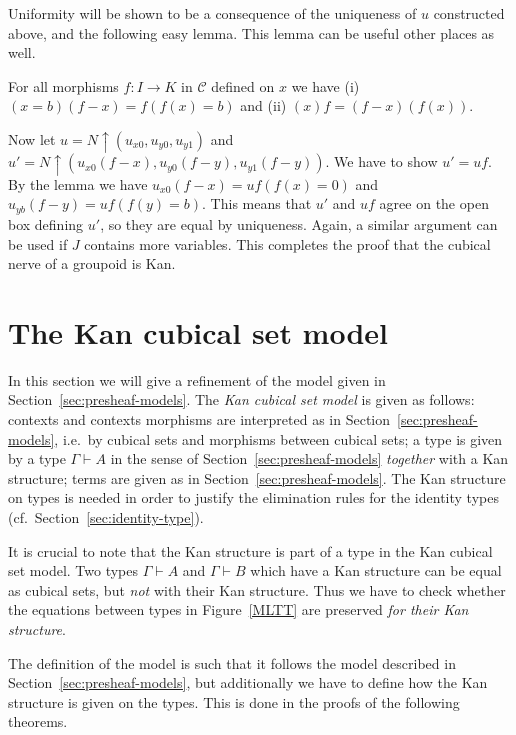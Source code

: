 \documentclass[10pt,a4paper]{article}
\newcommand{\CC}{{\mathcal C}}
\newcommand{\rup}[1]{#1{\uparrow}}
\begin{document}
Uniformity will be shown to be a consequence of the uniqueness of
$u$ constructed above, and the following easy lemma.
This lemma can be useful other places as well.
\begin{lemma}  For all morphisms $f:I\to K$ in $\CC$ defined on $x$ we have
(i) $(x=b)(f-x) = f (f(x)=b)$ and (ii) $(x)f = (f-x)(f(x))$.
\end{lemma}
Now let $u=\rup{N}(u_{x0},u_{y0},u_{y1})$ and
$u'=\rup{N}(u_{x0}(f-x),u_{y0}(f-y),u_{y1}(f-y))$.
We have to show $u'=uf$.
By the lemma we have $u_{x0}(f-x) = uf(f(x)=0)$ and $u_{yb}(f-y) = uf(f(y)=b)$.
This means that $u'$ and $uf$ agree on the open box defining $u'$,
so they are equal by uniqueness.
Again, a similar argument can be used if $J$ contains more variables.
This completes the proof that the cubical nerve of a groupoid is Kan.

\section{The Kan cubical set model}\label{sec:kancubsetmodel}

In this section we will give a refinement of the model given in
Section~\ref{sec:presheaf-models}.  The \emph{Kan cubical set model}
is given as follows: contexts and contexts morphisms are interpreted
as in Section~\ref{sec:presheaf-models}, i.e.\ by cubical sets and
morphisms between cubical sets; a type is given by a type $\Gamma
\vdash A$ in the sense of Section~\ref{sec:presheaf-models}
\emph{together} with a Kan structure; terms are given as in
Section~\ref{sec:presheaf-models}. The Kan structure on types is
needed in order to justify the elimination rules for the identity
types (cf.\ Section~\ref{sec:identity-type}).

It is crucial to note that the Kan structure is part of a type in the
Kan cubical set model.  Two types $\Gamma \vdash A$ and $\Gamma \vdash
B$ which have a Kan structure can be equal as cubical sets, but
\emph{not} with their Kan structure.  Thus we have to check whether
the equations between types in Figure~\ref{MLTT} are preserved
\emph{for their Kan structure}.

The definition of the model is such that it follows the model
described in Section~\ref{sec:presheaf-models}, but additionally we
have to define how the Kan structure is given on the types.  This is
done in the proofs of the following theorems.
\end{document}
